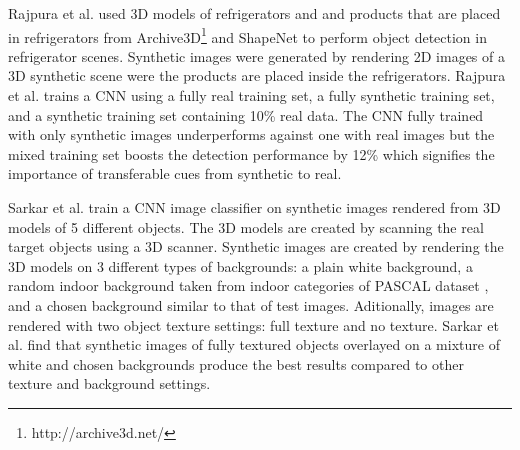 Rajpura et al. \cite{rajpura2017object} used 3D models of refrigerators and and products that are placed in refrigerators from Archive3D\footnote{http://archive3d.net/} and ShapeNet \cite{chang2015shapenet} to perform object detection in refrigerator scenes. Synthetic images were generated by rendering 2D images of a 3D synthetic scene were the products are placed inside the refrigerators. Rajpura et al. trains a CNN using a fully real training set, a fully synthetic training set, and a synthetic training set containing 10\% real data. The CNN fully trained with only synthetic images  underperforms against one with real images but the mixed training set boosts the detection performance by 12\% which signifies the importance of transferable cues from synthetic to real.

Sarkar et al. \cite{sarkar2017trained} train a CNN image classifier on synthetic images rendered from 3D models of 5 different objects. The 3D models are created by scanning the real target objects using a 3D scanner. Synthetic images are created by rendering the 3D models on 3 different types of backgrounds: a plain white background, a random indoor background taken from indoor categories of PASCAL dataset \cite{everingham2010pascal}, and a chosen background similar to that of test images. Aditionally, images are rendered with two object texture settings: full texture and no texture. Sarkar et al. find that synthetic images of fully textured objects overlayed on a mixture of white and chosen backgrounds produce the best results compared to other texture and background settings.
